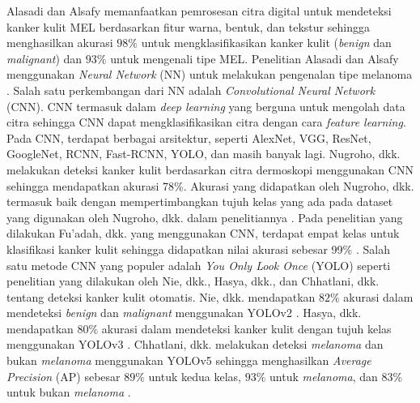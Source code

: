     Alasadi dan Alsafy memanfaatkan pemrosesan citra digital untuk mendeteksi kanker kulit MEL berdasarkan fitur warna, bentuk, dan tekstur sehingga menghasilkan akurasi $98\%$ untuk mengklasifikasikan kanker kulit (\textit{benign} dan \textit{malignant}) dan $93\%$ untuk mengenali tipe MEL. Penelitian Alasadi dan Alsafy menggunakan \textit{Neural Network} (NN) untuk melakukan pengenalan tipe melanoma \citep{Alasadi2015a}. Salah satu perkembangan dari NN adalah \textit{Convolutional Neural Network} (CNN). CNN termasuk dalam \textit{deep learning} yang berguna untuk mengolah data citra sehingga CNN dapat mengklasifikasikan citra dengan cara \textit{feature learning}. Pada CNN, terdapat berbagai arsitektur, seperti AlexNet, VGG, ResNet, GoogleNet, RCNN, Fast-RCNN, YOLO, dan masih banyak lagi. Nugroho, dkk. melakukan deteksi kanker kulit berdasarkan citra dermoskopi menggunakan CNN sehingga mendapatkan akurasi 78\%. Akurasi yang didapatkan oleh Nugroho, dkk. termasuk baik dengan mempertimbangkan tujuh kelas yang ada pada dataset yang digunakan oleh Nugroho, dkk. dalam penelitiannya \citep{Nugroho2019}. Pada penelitian yang dilakukan Fu’adah, dkk. yang menggunakan CNN, terdapat empat kelas untuk klasifikasi kanker kulit sehingga didapatkan nilai akurasi sebesar 99\% \citep{Fuadah2020a}. Salah satu metode CNN yang populer adalah \textit{You Only Look Once} (YOLO) seperti penelitian yang dilakukan oleh Nie, dkk., Hasya, dkk., dan Chhatlani, dkk. tentang deteksi kanker kulit otomatis. Nie, dkk. mendapatkan $82\%$ akurasi dalam mendeteksi \textit{benign} dan \textit{malignant} menggunakan YOLOv2 \citep{Nie2019a}. Hasya, dkk. mendapatkan $80\%$ akurasi dalam mendeteksi kanker kulit dengan tujuh kelas menggunakan YOLOv3 \citep{Hasya2021}. Chhatlani, dkk. melakukan deteksi \textit{melanoma} dan bukan \textit{melanoma} menggunakan YOLOv5 sehingga menghasilkan \textit{Average Precision} (AP) sebesar $89\%$ untuk kedua kelas, $93\%$ untuk \textit{melanoma}, dan $83\%$ untuk bukan \textit{melanoma} \citep{Chhatlani2022a}.

